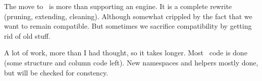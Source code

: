 
\startdocument
  [title=After the cleanup,
   color=darkred]

\StartSteps

\startsubject[title=The update]

    \startitemize[packed]

        \startitem The move to \MKIV\ is more than supporting an engine. \stopitem \FlushStep
        \startitem It is a complete rewrite (pruning, extending, cleaning). \stopitem \FlushStep
        \startitem Although somewhat crippled by the fact that we want to remain compatible. \stopitem \FlushStep
        \startitem But sometimes we sacrifice compatibility by getting rid of old stuff. \stopitem \FlushStep

    \stopitemize

\stopsubject

\startsubject[title=The current state]

    \startitemize[packed]

        \startitem A lot of work, more than I had thought, so it takes longer. \stopitem \FlushStep
        \startitem Most \TEX\ code is done (some structure and column code left). \stopitem \FlushStep
        \startitem New namespaces and helpers mostly done, but will be checked for constency. \stopitem \FlushStep

    \stopitemize

\stopsubject

\StopSteps

\page

\StartSteps

\startsubject[title=What is there todo]

    \startitemize[packed]

